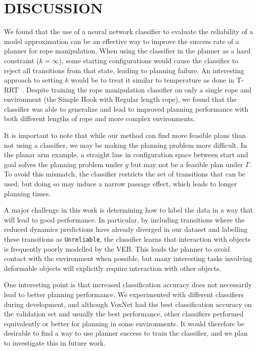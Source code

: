 \section{DISCUSSION}
\label{sec:discussion}


We found that the use of a neural network classifier to evaluate the reliability of a model approximation can be an effective way to improve the success rate of a planner for rope manipulation. When using the classifier in the planner as a hard constraint ($k = \infty$), some starting configurations would cause the classifier to reject all transitions from that state, leading to planning failure. An interesting approach to setting $k$ would be to treat it similar to temperature as done in T-RRT~\cite{Jaillet2008transition}. Despite training the rope manipulation classifier on only a single rope and environment (the Simple Hook with Regular length rope), we found that the classifier was able to generalize and lead to improved planning performance with both different lengths of rope and more complex environments. %

It is important to note that while our method can find more feasible plans than not using a classifier, we may be making the planning problem more difficult. In the planar arm example, a straight line in configuration space between start and goal solves the planning problem under $g$ but may not be a feasible plan under $\Gamma$. To avoid this mismatch, the classifier restricts the set of transitions that can be used, but doing so may induce a narrow passage effect, which leads to longer planning times.

A major challenge in this work is determining how to label the data in a way that will lead to good performance. In particular, by including transitions where the reduced dynamics predictions have already diverged in our dataset and labelling these transitions as \texttt{Unreliable}, the classifier learns that interaction with objects is frequently poorly modelled by the VEB. This leads the planner to avoid contact with the environment when possible, but many interesting tasks involving deformable objects will explicitly require interaction with other objects.

One interesting point is that increased classification accuracy does not necessarily lead to better planning performance. We experimented with different classifiers during development, and although VoxNet had the best classification accuracy on the validation set and usually the best performance, other classifiers performed equivalently or better for planning in some environments. It would therefore be desirable to find a way to use planner success to train the classifier, and we plan to investigate this in future work.

